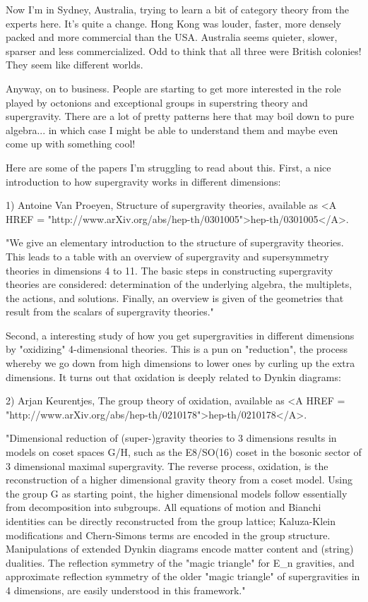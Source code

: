 



Now I'm in Sydney, Australia, trying to learn a bit of category theory
from the experts here.  It's quite a change.  Hong Kong was louder, 
faster, more densely packed and more commercial than the USA.
Australia seems quieter, slower, sparser and less commercialized.
Odd to think that all three were British colonies!  They seem like
different worlds.

Anyway, on to business.  People are starting to get more interested
in the role played by octonions and exceptional groups in superstring
theory and supergravity.  There are a lot of pretty patterns here that
may boil down to pure algebra... in which case I might be able to
understand them and maybe even come up with something cool!

Here are some of the papers I'm struggling to read about this.  First, 
a nice introduction to how supergravity works in different dimensions:

1) Antoine Van Proeyen, Structure of supergravity theories, available as
<A HREF = "http://www.arXiv.org/abs/hep-th/0301005">hep-th/0301005</A>. 


 "We give an elementary introduction to the structure of
supergravity theories.  This leads to a table with an overview of
supergravity and supersymmetry theories in dimensions 4 to 11.  The
basic steps in constructing supergravity theories are considered:
determination of the underlying algebra, the multiplets, the actions,
and solutions.  Finally, an overview is given of the geometries that
result from the scalars of supergravity theories."

Second, a interesting study of how you get supergravities in 
different dimensions by "oxidizing" 4-dimensional theories. 
This is a pun on "reduction", the process whereby we go down from
high dimensions to lower ones by curling up the extra dimensions.
It turns out that oxidation is deeply related to Dynkin diagrams:

2) Arjan Keurentjes, The group theory of oxidation, available as
<A HREF = "http://www.arXiv.org/abs/hep-th/0210178">hep-th/0210178</A>.


"Dimensional reduction of (super-)gravity theories to 3 dimensions
results in \sigma  models on coset spaces G/H, such as the E8/SO(16) coset
in the bosonic sector of 3 dimensional maximal supergravity.  The
reverse process, oxidation, is the reconstruction of a higher
dimensional gravity theory from a coset \sigma  model. Using the group G
as starting point, the higher dimensional models follow essentially from
decomposition into subgroups.  All equations of motion and Bianchi
identities can be directly reconstructed from the group lattice;
Kaluza-Klein modifications and Chern-Simons terms are encoded in the
group structure.  Manipulations of extended Dynkin diagrams encode
matter content and (string) dualities.  The reflection symmetry of the
"magic triangle" for E_{n} gravities, and approximate
reflection symmetry of the older "magic triangle" of
supergravities in 4 dimensions, are easily understood in this
framework."

